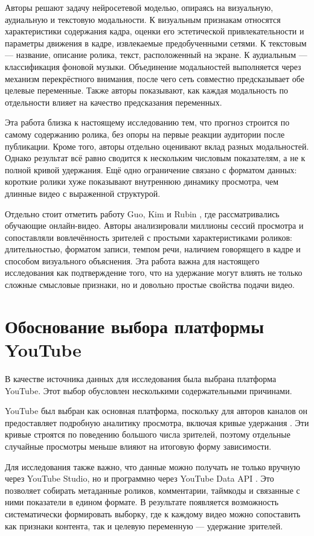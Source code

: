 \documentclass[times]{itmo-student-thesis}
\begin{document}
Авторы решают задачу нейросетевой моделью, опираясь на визуальную, аудиальную и текстовую модальности. К визуальным признакам относятся характеристики содержания кадра, оценки его эстетической привлекательности и параметры движения в кадре, извлекаемые предобученными сетями. К текстовым — название, описание ролика, текст, расположенный на экране. К аудиальным — классификация фоновой музыки. Объединение модальностей выполняется через механизм перекрёстного внимания, после чего сеть совместно предсказывает обе целевые переменные. Также авторы показывают, как каждая модальность по отдельности влияет на качество предсказания переменных.

Эта работа близка к настоящему исследованию тем, что прогноз строится по самому содержанию ролика, без опоры на первые реакции аудитории после публикации. Кроме того, авторы отдельно оценивают вклад разных модальностей. Однако результат всё равно сводится к нескольким числовым показателям, а не к полной кривой удержания. Ещё одно ограничение связано с форматом данных: короткие ролики хуже показывают внутреннюю динамику просмотра, чем длинные видео с выраженной структурой.

Отдельно стоит отметить работу Guo, Kim и Rubin \cite{guo2014mooc}, где рассматривались обучающие онлайн-видео. Авторы анализировали миллионы сессий просмотра и сопоставляли вовлечённость зрителей с простыми характеристиками роликов: длительностью, форматом записи, темпом речи, наличием говорящего в кадре и способом визуального объяснения. Эта работа важна для настоящего исследования как подтверждение того, что на удержание могут влиять не только сложные смысловые признаки, но и довольно простые свойства подачи видео.

\section{Обоснование выбора платформы YouTube}

В качестве источника данных для исследования была выбрана платформа YouTube. Этот выбор обусловлен несколькими содержательными причинами.

YouTube был выбран как основная платформа, поскольку для авторов каналов он предоставляет подробную аналитику просмотра, включая кривые удержания \cite{youtube2026retention}. Эти кривые строятся по поведению большого числа зрителей, поэтому отдельные случайные просмотры меньше влияют на итоговую форму зависимости.

Для исследования также важно, что данные можно получать не только вручную через YouTube Studio, но и программно через YouTube Data API \cite{youtube2026retention}. Это позволяет собирать метаданные роликов, комментарии, таймкоды и связанные с ними показатели в едином формате. В результате появляется возможность систематически формировать выборку, где к каждому видео можно сопоставить как признаки контента, так и целевую переменную — удержание зрителей.
\end{document}
